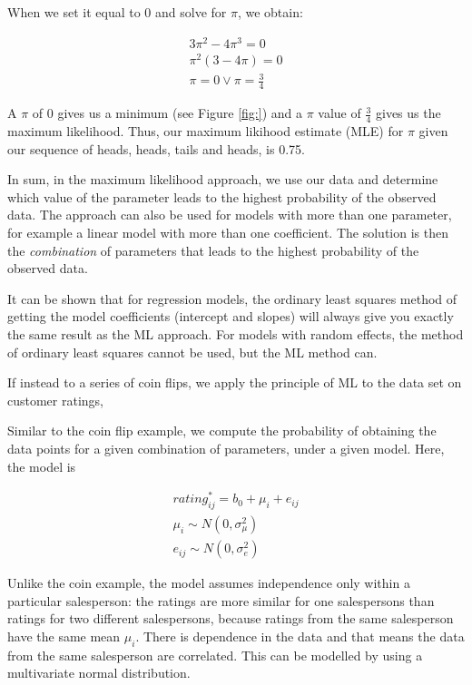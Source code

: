 When we set it equal to 0 and solve for $\pi$, we obtain:

\begin{eqnarray}
3 \pi^2 - 4\pi^3 = 0 \\
\pi^2 ( 3- 4 \pi) = 0 \\
\pi = 0 \vee \pi = \frac{3}{4}
\end{eqnarray}

A $\pi$ of 0 gives us a minimum (see Figure \ref{fig:}) and a $\pi$ value of $\frac{3}{4}$ gives us the maximum likelihood. Thus, our maximum likihood estimate (MLE) for $\pi$ given our sequence of heads, heads, tails and heads, is 0.75.

In sum, in the maximum likelihood approach, we use our data and determine which value of the parameter leads to the highest probability of the observed data. The approach can also be used for models with more than one parameter, for example a linear model with more than one coefficient. The solution is then the \textit{combination} of parameters that leads to the highest probability of the observed data.

It can be shown that for regression models, the ordinary least squares method of getting the model coefficients (intercept and slopes) will always give you exactly the same result as the ML approach. For models with random effects, the method of ordinary least squares cannot be used, but the ML method can.




If instead to a series of coin flips, we apply the principle of ML to the data set on customer ratings, 

Similar to the coin flip example, we compute the probability of obtaining the data points for a given combination of parameters, under a given model. Here, the model is

\begin{eqnarray}
rating^*_{ij} = b_0 + \mu_i + e_{ij} \\
\mu_i \sim N(0, \sigma_\mu^2 ) \\
e_{ij} \sim N(0,\sigma_e^2 )
\end{eqnarray}


Unlike the coin example, the model assumes independence only within a particular salesperson: the ratings are more similar for one salespersons than ratings for two different salespersons, because ratings from the same salesperson have the same mean $\mu_i$. There is dependence in the data and that means the data from the same salesperson are correlated. This can be modelled by using a multivariate normal distribution. 

